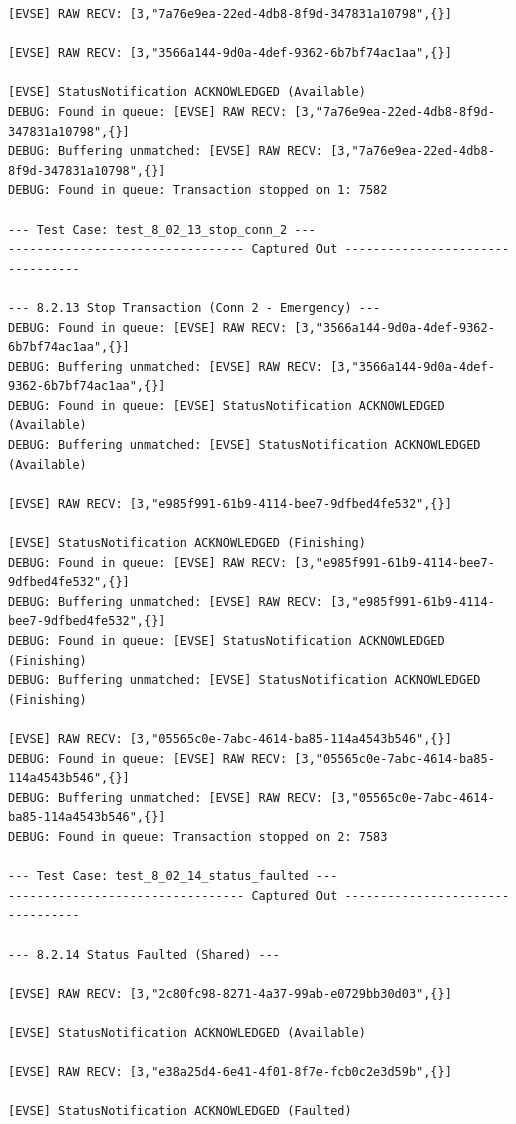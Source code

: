 \documentclass{article}
\begin{document}
\begin{lstlisting}
[EVSE] RAW RECV: [3,"7a76e9ea-22ed-4db8-8f9d-347831a10798",{}]

[EVSE] RAW RECV: [3,"3566a144-9d0a-4def-9362-6b7bf74ac1aa",{}]

[EVSE] StatusNotification ACKNOWLEDGED (Available)
DEBUG: Found in queue: [EVSE] RAW RECV: [3,"7a76e9ea-22ed-4db8-8f9d-347831a10798",{}]
DEBUG: Buffering unmatched: [EVSE] RAW RECV: [3,"7a76e9ea-22ed-4db8-8f9d-347831a10798",{}]
DEBUG: Found in queue: Transaction stopped on 1: 7582

--- Test Case: test_8_02_13_stop_conn_2 ---
--------------------------------- Captured Out ---------------------------------

--- 8.2.13 Stop Transaction (Conn 2 - Emergency) ---
DEBUG: Found in queue: [EVSE] RAW RECV: [3,"3566a144-9d0a-4def-9362-6b7bf74ac1aa",{}]
DEBUG: Buffering unmatched: [EVSE] RAW RECV: [3,"3566a144-9d0a-4def-9362-6b7bf74ac1aa",{}]
DEBUG: Found in queue: [EVSE] StatusNotification ACKNOWLEDGED (Available)
DEBUG: Buffering unmatched: [EVSE] StatusNotification ACKNOWLEDGED (Available)

[EVSE] RAW RECV: [3,"e985f991-61b9-4114-bee7-9dfbed4fe532",{}]

[EVSE] StatusNotification ACKNOWLEDGED (Finishing)
DEBUG: Found in queue: [EVSE] RAW RECV: [3,"e985f991-61b9-4114-bee7-9dfbed4fe532",{}]
DEBUG: Buffering unmatched: [EVSE] RAW RECV: [3,"e985f991-61b9-4114-bee7-9dfbed4fe532",{}]
DEBUG: Found in queue: [EVSE] StatusNotification ACKNOWLEDGED (Finishing)
DEBUG: Buffering unmatched: [EVSE] StatusNotification ACKNOWLEDGED (Finishing)

[EVSE] RAW RECV: [3,"05565c0e-7abc-4614-ba85-114a4543b546",{}]
DEBUG: Found in queue: [EVSE] RAW RECV: [3,"05565c0e-7abc-4614-ba85-114a4543b546",{}]
DEBUG: Buffering unmatched: [EVSE] RAW RECV: [3,"05565c0e-7abc-4614-ba85-114a4543b546",{}]
DEBUG: Found in queue: Transaction stopped on 2: 7583

--- Test Case: test_8_02_14_status_faulted ---
--------------------------------- Captured Out ---------------------------------

--- 8.2.14 Status Faulted (Shared) ---

[EVSE] RAW RECV: [3,"2c80fc98-8271-4a37-99ab-e0729bb30d03",{}]

[EVSE] StatusNotification ACKNOWLEDGED (Available)

[EVSE] RAW RECV: [3,"e38a25d4-6e41-4f01-8f7e-fcb0c2e3d59b",{}]

[EVSE] StatusNotification ACKNOWLEDGED (Faulted)


\end{lstlisting}
\end{document}
